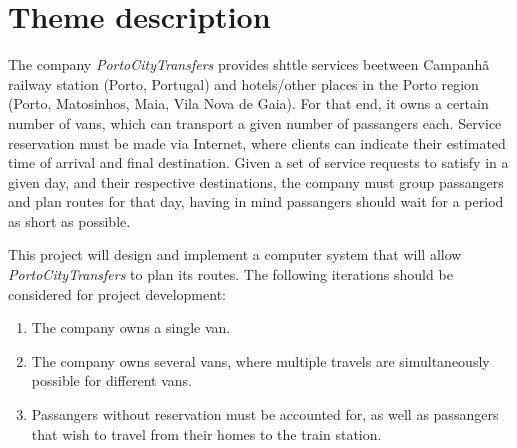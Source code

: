 \chapter{Theme description}
The company \emph{PortoCityTransfers} provides shttle services beetween Campanhã railway station (Porto, Portugal) and hotels/other places in the Porto region (Porto, Matosinhos, Maia, Vila Nova de Gaia). For that end, it owns a certain number of vans, which can transport a given number of passangers each. Service reservation must be made via Internet, where clients can indicate their estimated time of arrival and final destination. Given a set of service requests to satisfy in a given day, and their respective destinations, the company must group passangers and plan routes for that day, having in mind passangers should wait for a period as short as possible.\par
This project will design and implement a computer system that will allow \emph{PortoCityTransfers} to plan its routes. The following iterations should be considered for project development:
\begin{enumerate}
    \item The company owns a single van.
    \item The company owns several vans, where multiple travels are simultaneously possible for different vans.
    \item Passangers without reservation must be accounted for, as well as passangers that wish to travel from their homes to the train station.
\end{enumerate}